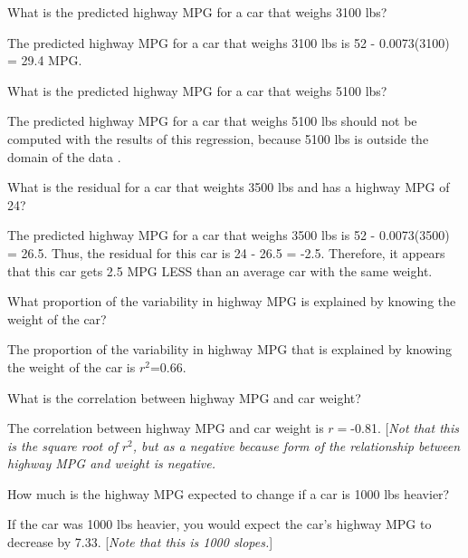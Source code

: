 \documentclass[10pt,openany]{book}\usepackage[]{graphicx}\usepackage[]{color}
\begin{document}
\begin{QAlist}
\begin{QAlist}
  \end{QAlist}
  \item What is the predicted highway MPG for a car that weighs 3100 lbs?
  \begin{QAlist}
    \item The predicted highway MPG for a car that weighs 3100 lbs is 52 - 0.0073(3100) = 29.4 MPG.
  \end{QAlist}
  \item What is the predicted highway MPG for a car that weighs 5100 lbs?
  \begin{QAlist}
    \item The predicted highway MPG for a car that weighs 5100 lbs should not be computed with the results of this regression, because 5100 lbs is outside the domain of the data .
  \end{QAlist}
  \item What is the residual for a car that weights 3500 lbs and has a highway MPG of 24?
  \begin{QAlist}
    \item The predicted highway MPG for a car that weighs 3500 lbs is 52 - 0.0073(3500) = 26.5. Thus, the residual for this car is 24 - 26.5 = -2.5. Therefore, it appears that this car gets 2.5 MPG LESS than an average car with the same weight.
  \end{QAlist}
  \item What proportion of the variability in highway MPG is explained by knowing the weight of the car?
  \begin{QAlist}
    \item The proportion of the variability in highway MPG that is explained by knowing the weight of the car is $r^{2}$=0.66.
  \end{QAlist}
  \item What is the correlation between highway MPG and car weight?
  \begin{QAlist}
    \item The correlation between highway MPG and car weight is $r=$-0.81. [\emph{Not that this is the square root of $r^{2}$, but as a negative because form of the relationship between highway MPG and weight is negative.}
  \end{QAlist}
  \item How much is the highway MPG expected to change if a car is 1000 lbs heavier?
  \begin{QAlist}
    \item If the car was 1000 lbs heavier, you would expect the car's highway MPG to decrease by 7.33. [\emph{Note that this is 1000 slopes.}]
  \end{QAlist}
\end{QAlist}
\end{document}
